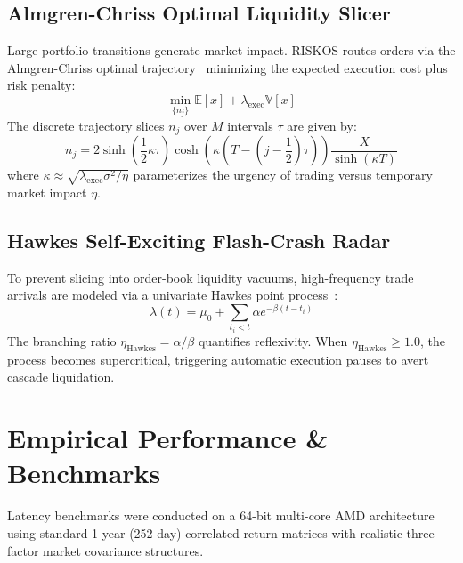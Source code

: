 \documentclass[10pt,journal,compsoc]{IEEEtran}
\begin{document}
\subsection{Almgren-Chriss Optimal Liquidity Slicer}
Large portfolio transitions generate market impact. RISKOS routes orders via the Almgren-Chriss optimal trajectory~\cite{almgren2000optimal} minimizing the expected execution cost plus risk penalty:
\begin{equation}
\min_{\{n_j\}} \mathbb{E}[x] + \lambda_{\text{exec}} \mathbb{V}[x]
\end{equation}
The discrete trajectory slices $n_j$ over $M$ intervals $\tau$ are given by:
\begin{equation}
n_j = 2 \sinh\left(\frac{1}{2} \kappa \tau\right) \cosh\left(\kappa (T - (j - \frac{1}{2})\tau)\right) \frac{X}{\sinh(\kappa T)}
\end{equation}
where $\kappa \approx \sqrt{\lambda_{\text{exec}} \sigma^2 / \eta}$ parameterizes the urgency of trading versus temporary market impact $\eta$.

\subsection{Hawkes Self-Exciting Flash-Crash Radar}
To prevent slicing into order-book liquidity vacuums, high-frequency trade arrivals are modeled via a univariate Hawkes point process~\cite{hawkes1971spectra}:
\begin{equation}
\lambda(t) = \mu_0 + \sum_{t_i < t} \alpha e^{-\beta (t - t_i)}
\end{equation}
The branching ratio $\eta_{\text{Hawkes}} = \alpha / \beta$ quantifies reflexivity. When $\eta_{\text{Hawkes}} \ge 1.0$, the process becomes supercritical, triggering automatic execution pauses to avert cascade liquidation.

\section{Empirical Performance \& Benchmarks}
\label{sec:benchmarks}
Latency benchmarks were conducted on a 64-bit multi-core AMD architecture using standard 1-year (252-day) correlated return matrices with realistic three-factor market covariance structures.
\end{document}
